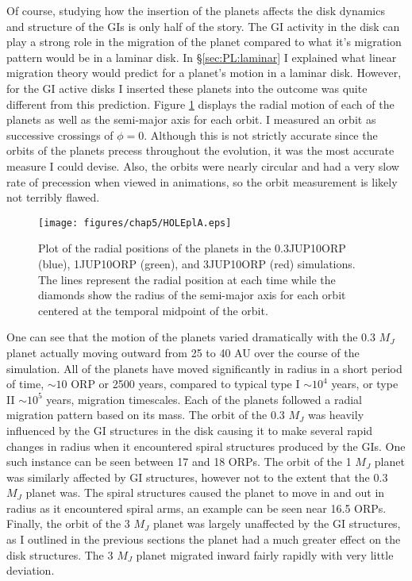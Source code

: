 Of course, studying how the insertion of the planets affects the disk dynamics and structure of the GIs is only half of the story. The GI activity in the disk can play a strong role in the migration of the planet compared to what it's migration pattern would be in a laminar disk. In  \S\ref{sec:PL:laminar} I explained what linear migration theory would predict for a planet's motion in a laminar disk. However, for the GI active disks I inserted these planets into the outcome was quite different from this prediction. Figure \ref{fig:PL:ahole} displays the radial motion of each of the planets as well as the semi-major axis for each orbit. I measured an orbit as successive crossings of $\phi = 0$. Although this is not strictly accurate since the orbits of the planets precess throughout the evolution, it was the most accurate measure I could devise. Also, the orbits were nearly circular and had a very slow rate of precession when viewed in animations, so the orbit measurement is likely not terribly flawed.

\begin{figure}[p]
\centering
\texttt{[image: figures/chap5/HOLEplA.eps]}
\caption[NEED TAGLINE]{Plot of the radial positions of the planets in the 0.3JUP10ORP (blue), 1JUP10ORP (green), and 3JUP10ORP (red) simulations. The lines represent the radial position at each time while the diamonds show the radius of the semi-major axis for each orbit centered at the temporal midpoint of the orbit.}
\label{fig:PL:ahole}
\end{figure}

One can see that the motion of the planets varied dramatically with the 0.3 $M_J$ planet actually moving outward from 25 to 40 AU over the course of the simulation. All of the planets have moved significantly in radius in a short period of time, $\sim\!10$ ORP or 2500 years, compared to typical type I $\sim\!10^4$ years, or type II $\sim\!10^5$ years, migration timescales. Each of the planets followed a radial migration pattern based on its mass. The orbit of the 0.3 $M_J$ was heavily influenced by the GI structures in the disk causing it to make several rapid changes in radius when it encountered spiral structures produced by the GIs. One such instance can be seen between 17 and 18 ORPs. The orbit of the 1 $M_J$ planet was similarly affected by GI structures, however not to the extent that the 0.3 $M_J$ planet was. The spiral structures caused the planet to move in and out in radius as it encountered spiral arms, an example can be seen near 16.5 ORPs. Finally, the orbit of the 3 $M_J$ planet was largely unaffected by the GI structures, as I outlined in the previous sections the planet had a much greater effect on the disk structures. The 3 $M_J$ planet migrated inward fairly rapidly with very little deviation.

